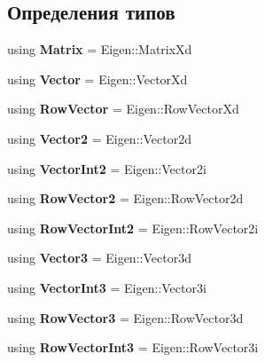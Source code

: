 \subsection*{Определения типов}
\begin{DoxyCompactItemize}
\item 
using {\bfseries Matrix} = Eigen\+::\+Matrix\+Xd\hypertarget{namespace_math_a20679a74232d910c29bec6c443fae428}{}\label{namespace_math_a20679a74232d910c29bec6c443fae428}

\item 
using {\bfseries Vector} = Eigen\+::\+Vector\+Xd\hypertarget{namespace_math_aa19579150aa3450d96cf05232e95c7d0}{}\label{namespace_math_aa19579150aa3450d96cf05232e95c7d0}

\item 
using {\bfseries Row\+Vector} = Eigen\+::\+Row\+Vector\+Xd\hypertarget{namespace_math_a5a5c543ecc4a5c3cf8fc42bb2b814e92}{}\label{namespace_math_a5a5c543ecc4a5c3cf8fc42bb2b814e92}

\item 
using {\bfseries Vector2} = Eigen\+::\+Vector2d\hypertarget{namespace_math_a829dcabcf6c01e2f7a8e592f6df39595}{}\label{namespace_math_a829dcabcf6c01e2f7a8e592f6df39595}

\item 
using {\bfseries Vector\+Int2} = Eigen\+::\+Vector2i\hypertarget{namespace_math_a04a70f9be53a2317bed18efb51bd10e0}{}\label{namespace_math_a04a70f9be53a2317bed18efb51bd10e0}

\item 
using {\bfseries Row\+Vector2} = Eigen\+::\+Row\+Vector2d\hypertarget{namespace_math_a5957cc0bbedd7dca439cf843a91f9572}{}\label{namespace_math_a5957cc0bbedd7dca439cf843a91f9572}

\item 
using {\bfseries Row\+Vector\+Int2} = Eigen\+::\+Row\+Vector2i\hypertarget{namespace_math_a94c905a0f42efd8189bf204369de9761}{}\label{namespace_math_a94c905a0f42efd8189bf204369de9761}

\item 
using {\bfseries Vector3} = Eigen\+::\+Vector3d\hypertarget{namespace_math_acbf8101054f0439edce3f14dbe76ed36}{}\label{namespace_math_acbf8101054f0439edce3f14dbe76ed36}

\item 
using {\bfseries Vector\+Int3} = Eigen\+::\+Vector3i\hypertarget{namespace_math_ac67068e5789993d8bd02af01a4f2701b}{}\label{namespace_math_ac67068e5789993d8bd02af01a4f2701b}

\item 
using {\bfseries Row\+Vector3} = Eigen\+::\+Row\+Vector3d\hypertarget{namespace_math_abf6a25b9fd91fec597fc5c822ac94ca7}{}\label{namespace_math_abf6a25b9fd91fec597fc5c822ac94ca7}

\item 
using {\bfseries Row\+Vector\+Int3} = Eigen\+::\+Row\+Vector3i\hypertarget{namespace_math_a35e6cbc8f1896dd8188cb58db1464308}{}\label{namespace_math_a35e6cbc8f1896dd8188cb58db1464308}

\end{DoxyCompactItemize}
